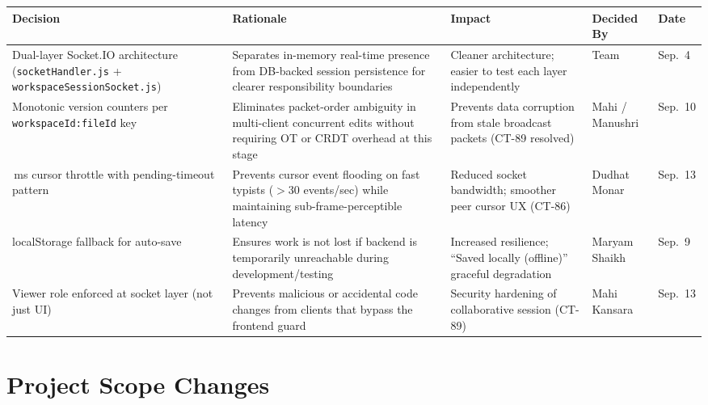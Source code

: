 \documentclass[11pt,a4paper]{article}
\begin{document}
\begin{table}[htbp]
\centering
\label{tab:project-decisions}
\renewcommand{\arraystretch}{1.3}

\begin{tabular}{>{\raggedright\arraybackslash}p{3.2cm}
                >{\raggedright\arraybackslash}p{4.0cm}
                >{\raggedright\arraybackslash}p{3.5cm}
                >{\centering\arraybackslash}p{2.0cm}
                >{\centering\arraybackslash}p{1.5cm}}
\toprule
\textbf{Decision} &
\textbf{Rationale} &
\textbf{Impact} &
\textbf{Decided By} &
\textbf{Date} \\
\midrule

Dual-layer Socket.IO architecture (\texttt{socketHandler.js} + \texttt{workspaceSessionSocket.js}) &
Separates in-memory real-time presence from DB-backed session persistence for clearer responsibility boundaries &
Cleaner architecture; easier to test each layer independently &
Team &
Sep.\ 4 \\

Monotonic version counters per \texttt{workspaceId:fileId} key &
Eliminates packet-order ambiguity in multi-client concurrent edits without requiring OT or CRDT overhead at this stage &
Prevents data corruption from stale broadcast packets (CT-89 resolved) &
Mahi / Manushri &
Sep.\ 10 \\

30\,ms cursor throttle with pending-timeout pattern &
Prevents cursor event flooding on fast typists ($>$30 events/sec) while maintaining sub-frame-perceptible latency &
Reduced socket bandwidth; smoother peer cursor UX (CT-86) &
Dudhat Monar &
Sep.\ 13 \\

localStorage fallback for auto-save &
Ensures work is not lost if backend is temporarily unreachable during development/testing &
Increased resilience; ``Saved locally (offline)'' graceful degradation &
Maryam Shaikh &
Sep.\ 9 \\

Viewer role enforced at socket layer (not just UI) &
Prevents malicious or accidental code changes from clients that bypass the frontend guard &
Security hardening of collaborative session (CT-89) &
Mahi Kansara &
Sep.\ 13 \\

\bottomrule
\end{tabular}
\end{table}

\section{Project Scope Changes}
\end{document}
